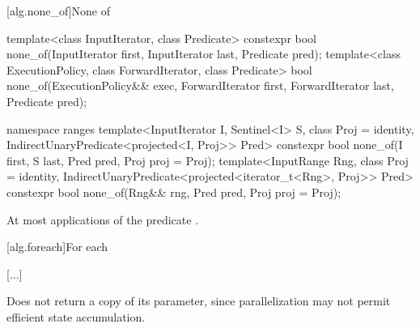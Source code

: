 [alg.none_of]{None of}

%
\begin{itemdecl}
template<class InputIterator, class Predicate>
  constexpr bool none_of(InputIterator first, InputIterator last, Predicate pred);
template<class ExecutionPolicy, class ForwardIterator, class Predicate>
  bool none_of(ExecutionPolicy&& exec, ForwardIterator first, ForwardIterator last,
               Predicate pred);
\end{itemdecl}\begin{addedblock}\begin{itemdecl}
namespace ranges {
  template<InputIterator I, Sentinel<I> S, class Proj = identity,
      IndirectUnaryPredicate<projected<I, Proj>> Pred>
    constexpr bool none_of(I first, S last, Pred pred, Proj proj = Proj{});
  template<InputRange Rng, class Proj = identity,
      IndirectUnaryPredicate<projected<iterator_t<Rng>, Proj>> Pred>
    constexpr bool none_of(Rng&& rng, Pred pred, Proj proj = Proj{});
}
\end{itemdecl}\end{addedblock}

\begin{itemdescr}
\pnum
{}

\pnum
{}


\pnum
\complexity At most  applications of the predicate
.
\end{itemdescr}

[alg.foreach]{For each}

[...]

\setcounter{Paras}{9}
\begin{itemdescr}
\pnum
\begin{note}
Does not return a copy of its  parameter, since
parallelization may not permit efficient state accumulation.
\end{note}
\end{itemdescr}

